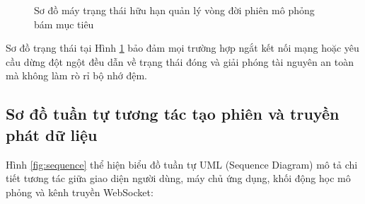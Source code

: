 \begin{figure}[H]
{%
}
\caption{Sơ đồ máy trạng thái hữu hạn quản lý vòng đời phiên mô phỏng bám mục tiêu}
\label{fig:session-state}
\end{figure}

Sơ đồ trạng thái tại Hình \ref{fig:session-state} bảo đảm mọi trường hợp ngắt kết nối mạng hoặc yêu cầu dừng đột ngột đều dẫn về trạng thái đóng và giải phóng tài nguyên an toàn mà không làm rò rỉ bộ nhớ đệm.

\subsection{Sơ đồ tuần tự tương tác tạo phiên và truyền phát dữ liệu}

\hspace{0.5cm} Hình \ref{fig:sequence} thể hiện biểu đồ tuần tự UML (Sequence Diagram) mô tả chi tiết tương tác giữa giao diện người dùng, máy chủ ứng dụng, khối động học mô phỏng và kênh truyền WebSocket:

